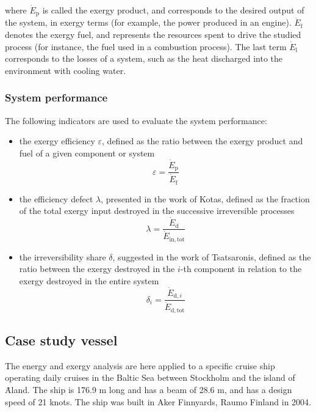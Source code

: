 \documentclass[preprint,12pt]{elsarticle}
\begin{document}
where $\dot{E}_{\mathrm{p}}$ is called the exergy product, and corresponds to the desired output of the system, in exergy terms (for example, the power produced in an engine). $\dot{E}_{\mathrm{f}}$ denotes the exergy fuel, and represents the resources spent to drive the studied process (for instance, the fuel used in a combustion process). The last term $\dot{E}_{\mathrm{l}}$ corresponds to the losses of a system, such as the heat discharged into the environment with cooling water. 

\subsubsection{System performance}

The following indicators are used to evaluate the system performance:
\begin{itemize}
	\item the exergy efficiency $\varepsilon$, defined as the ratio between the exergy product and fuel of a given component or system
	\begin{equation} \varepsilon = \frac{\dot{E}_{\mathrm{p}}}{\dot{E}_{\mathrm{f}}} \end{equation}
	\item the efficiency defect $\lambda$, presented in the work of Kotas, defined as the fraction of the total exergy input destroyed in the successive irreversible processes
	\begin{equation} \lambda = \frac{\dot{E}_{\mathrm{d}}}{\dot{E}_{\mathrm{in,tot}}} \end{equation}
	\item  the irreversibility share $\delta$, suggested in the work of Tsatsaronis, defined as the ratio between the exergy destroyed in the $i$-th component in relation to the exergy destroyed in the entire system
	\begin{equation} \delta_i = \frac{\dot{E}_{\mathrm{d},i}}{\dot{E}_{\mathrm{d,tot}}} \end{equation}
	
\end{itemize}    








\subsection{Case study vessel} \label{sec:met:case}

The energy and exergy analysis are here applied to a specific  cruise ship operating daily cruises in the Baltic Sea between Stockholm and the island of \.{A}land. The ship is 176.9 m long and has a beam of 28.6 m, and has a design speed of 21 knots. The ship was built in Aker Finnyards, Raumo Finland in 2004.
\end{document}
